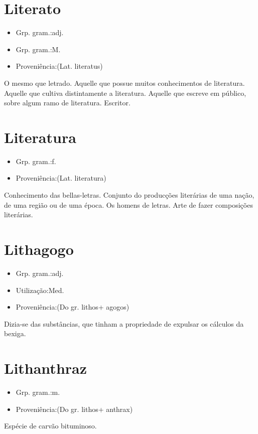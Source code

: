 \section{Literato}
\begin{itemize}
\item {Grp. gram.:adj.}
\end{itemize}
\begin{itemize}
\item {Grp. gram.:M.}
\end{itemize}
\begin{itemize}
\item {Proveniência:(Lat. \textunderscore literatus\textunderscore )}
\end{itemize}
O mesmo que \textunderscore letrado\textunderscore .
Aquelle que possue muitos conhecimentos de literatura.
Aquelle que cultiva distintamente a literatura.
Aquelle que escreve em público, sobre algum ramo de literatura.
Escritor.
\section{Literatura}
\begin{itemize}
\item {Grp. gram.:f.}
\end{itemize}
\begin{itemize}
\item {Proveniência:(Lat. \textunderscore literatura\textunderscore )}
\end{itemize}
Conhecimento das bellas-letras.
Conjunto do producções literárias de uma nação, de uma região ou de uma época.
Os homens de letras.
Arte de fazer composições literárias.
\section{Lithagogo}
\begin{itemize}
\item {Grp. gram.:adj.}
\end{itemize}
\begin{itemize}
\item {Utilização:Med.}
\end{itemize}
\begin{itemize}
\item {Proveniência:(Do gr. \textunderscore lithos\textunderscore  + \textunderscore agogos\textunderscore )}
\end{itemize}
Dizia-se das substâncias, que tinham a propriedade de expulsar os cálculos da bexiga.
\section{Lithanthraz}
\begin{itemize}
\item {Grp. gram.:m.}
\end{itemize}
\begin{itemize}
\item {Proveniência:(Do gr. \textunderscore lithos\textunderscore  + \textunderscore anthrax\textunderscore )}
\end{itemize}
Espécie de carvão bituminoso.
